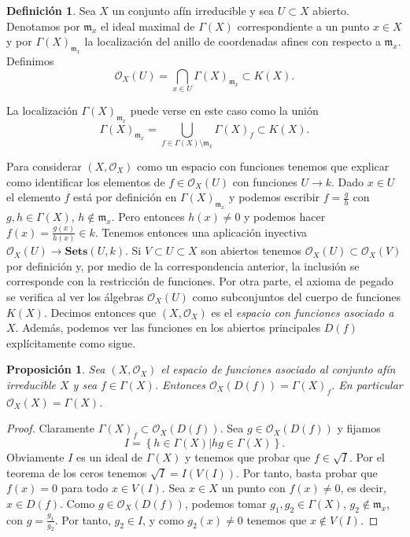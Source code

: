 \documentclass[12pt,a4paper]{article}
\newtheorem{prop}[thm]{Proposición}
\theoremstyle{definition} \newtheorem{defn}[thm]{Definición}
\theoremstyle{definition} \newtheorem{ejemplo}[thm]{Ejemplo}
\theoremstyle{definition} \newtheorem{ejercicio}[thm]{Ejercicio}
\theoremstyle{remark} \newtheorem*{obs}{Observación}
\def\OO{\mathscr{O}}
\def\mm{\mathfrak{m}}
\begin{document}
      \begin{defn}
	Sea $X$ un conjunto afín irreducible y sea $U\subset X$ abierto. Denotamos por $\mm_x$ el ideal maximal de $\Gamma(X)$ correspondiente a un punto $x\in X$ y por $\Gamma(X)_{\mm_x}$ la localización del anillo de coordenadas afines con respecto a $\mm_x$. Definimos
	\begin{equation*}
	  \OO_X(U)=\bigcap_{x\in U}\Gamma(X)_{\mm_x}\subset K(X).
	\end{equation*}
      \end{defn}
      La localización $\Gamma(X)_{\mm_x}$ puede verse en este caso como la unión
      \begin{equation*}
	\Gamma(X)_{\mm_x}=\bigcup_{f\in \Gamma(X)\setminus \mm_{x}} \Gamma(X)_{f} \subset K(X).
      \end{equation*}

      Para considerar $(X,\OO_X)$ como un espacio con funciones tenemos que explicar como identificar los elementos de $f\in \OO_X(U)$ con funciones $U\rightarrow k$. Dado $x\in U$ el elemento $f$ está por definición en $\Gamma(X)_{\mm_x}$ y podemos escribir $f=\frac{g}{h}$ con $g,h\in \Gamma(X)$, $h\not\in \mm_x$. Pero entonces $h(x)\neq 0$ y podemos hacer $f(x)=\frac{g(x)}{h(x)}\in k$. Tenemos entonces una aplicación inyectiva $\OO_X(U)\rightarrow \mathbf{Sets}(U,k)$.
      Si $V\subset U\subset X$ son abiertos tenemos $\OO_X(U)\subset \OO_X(V)$por definición y, por medio de la correspondencia anterior, la inclusión se corresponde con la restricción de funciones. Por otra parte, el axioma de pegado se verifica al ver los álgebras $\OO_X(U)$ como subconjuntos del cuerpo de funciones $K(X)$. Decimos entonces que $(X,\OO_X)$ es el \emph{espacio con funciones asociado a $X$}. Además, podemos ver las funciones en los abiertos principales $D(f)$ explícitamente como sigue.
      \begin{prop}
	Sea $(X,\OO_X)$ el espacio de funciones asociado al conjunto afín irreducible $X$ y sea $f\in \Gamma(X)$. Entonces $\OO_X(D(f))=\Gamma(X)_f$. En particular $\OO_X(X)=\Gamma(X)$.
      \end{prop}
      \begin{proof}
	Claramente $\Gamma(X)_f\subset \OO_X(D(f))$. Sea $g\in \OO_X(D(f))$ y fijamos
	\begin{equation*}
	  I=\left\{ h\in \Gamma(X)|hg\in \Gamma(X) \right\}.
	\end{equation*}
	Obviamente $I$ es un ideal de $\Gamma(X)$ y tenemos que probar que $f\in \sqrt{I}$. Por el teorema de los ceros tenemos $\sqrt{I}=I(V(I))$. Por tanto, basta probar que $f(x)=0$ para todo $x\in V(I)$. Sea $x\in X$ un punto con $f(x)\neq 0$, es decir, $x\in D(f)$. Como $g\in \OO_X(D(f))$, podemos tomar $g_1,g_2 \in \Gamma(X)$, $g_2\not\in \mm_x$, con $g=\frac{g_1}{g_2}$. Por tanto, $g_2\in I$, y como $g_2(x)\neq 0$ tenemos que $x\not\in V(I)$.
      \end{proof}
\end{document}
